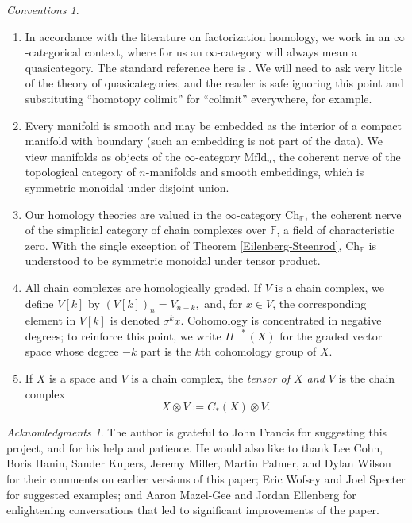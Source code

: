 \documentclass{compositio}
\theoremstyle{definition}\newtheorem{definition}{Definition}[section]
\theoremstyle{theorem}\newtheorem{lemma}[definition]{Lemma}
\theoremstyle{remark}\newtheorem*{conventions}{Conventions}
\theoremstyle{remark}\newtheorem*{acknowledgments}{Acknowledgments}
\theoremstyle{remark}\newtheorem*{outline}{Outline}
\theoremstyle{remark}\newtheorem*{questions}{Questions}
\theoremstyle{remark}\newtheorem{example}[definition]{Example}
\theoremstyle{definition}\newtheorem{construction}[definition]{Construction}
\theoremstyle{definition}\newtheorem*{convention}{Convention}
\theoremstyle{definition}\newtheorem*{conjecture}{Conjecture}
\theoremstyle{theorem}\newtheorem{theorem}[definition]{Theorem}
\theoremstyle{theorem}\newtheorem{paradigm}[definition]{Paradigm}
\theoremstyle{remark}\newtheorem{remark}[definition]{Remark}
\theoremstyle{corollary}\newtheorem{corollary}[definition]{Corollary}
\theoremstyle{theorem}\newtheorem{proposition}[definition]{Proposition}
\theoremstyle{definition}\newtheorem{question}[definition]{Question}
\begin{document}
\begin{conventions}\begin{enumerate}
\item In accordance with the literature on factorization homology, we work in an $\infty$-categorical context, where for us an $\infty$-category will always mean a quasicategory. The standard reference here is \cite{HTT}. We will need to ask very little of the theory of quasicategories, and the reader is safe ignoring this point and substituting ``homotopy colimit'' for ``colimit'' everywhere, for example.
\item Every manifold is smooth and may be embedded as the interior of a compact manifold with boundary (such an embedding is not part of the data). We view manifolds as objects of the $\infty$-category ${\mathrm{Mfld}}_n$, the coherent nerve of the topological category of $n$-manifolds and smooth embeddings, which is symmetric monoidal under disjoint union.
\item Our homology theories are valued in the $\infty$-category ${\mathrm{Ch}}_\mathbb{F}$, the coherent nerve of the simplicial category of chain complexes over $\mathbb{F}$, a field of characteristic zero. With the single exception of Theorem \ref{Eilenberg-Steenrod}, ${\mathrm{Ch}}_\mathbb{F}$ is understood to be symmetric monoidal under tensor product. 
\item All chain complexes are homologically graded. If $V$ is a chain complex, we define $V[k]$ by $(V[k])_n=V_{n-k},$ and, for $x\in V$, the corresponding element in $V[k]$ is denoted $\sigma^kx$. Cohomology is concentrated in negative degrees; to reinforce this point, we write $H^{-*}(X)$ for the graded vector space whose degree $-k$ part is the $k$th cohomology group of $X$.
\item If $X$ is a space and $V$ is a chain complex, the \emph{tensor of $X$ and $V$} is the chain complex $$X\otimes V:=C_*(X)\otimes V.$$
\end{enumerate}
\end{conventions}

\begin{acknowledgments}
The author is grateful to John Francis for suggesting this project, and for his help and patience. He would also like to thank Lee Cohn, Boris Hanin, Sander Kupers, Jeremy Miller, Martin Palmer, and Dylan Wilson for their comments on earlier versions of this paper; Eric Wofsey and Joel Specter for suggested examples; and Aaron Mazel-Gee and Jordan Ellenberg for enlightening conversations that led to significant improvements of the paper.
\end{acknowledgments}
\end{document}
